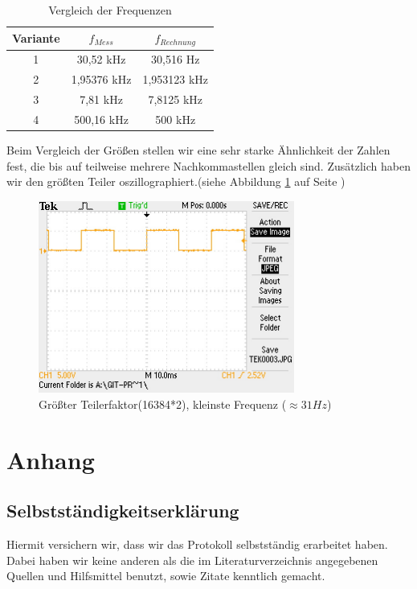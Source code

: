 \begin{table}[!ht]
\begin{center}
\begin{tabular}{||c|c|c||}
\hline 
\rule[-1ex]{0pt}{2.5ex} Variante & $f_{Mess}$ & $f_{Rechnung}$ \\ 
\hline 
\rule[-1ex]{0pt}{2.5ex} 1& 30,52 kHz & 30,516 Hz \\ 
\hline 
\rule[-1ex]{0pt}{2.5ex} 2&1,95376 kHz & 1,953123 kHz \\ 
\hline 
\rule[-1ex]{0pt}{2.5ex} 3&7,81 kHz & 7,8125 kHz \\ 
\hline 
\rule[-1ex]{0pt}{2.5ex} 4&500,16 kHz & 500 kHz \\ 
\hline 
\end{tabular} 
\caption{Vergleich der Frequenzen}
\end{center}
\end{table}
Beim Vergleich der Größen stellen wir eine sehr starke Ähnlichkeit der Zahlen fest, die bis auf teilweise mehrere Nachkommastellen gleich sind.
Zusätzlich haben wir den größten Teiler oszillographiert.(siehe Abbildung \ref{fq} auf Seite \pageref{fq})
\begin{figure}[!ht]
\begin{center}
\includegraphics[width=0.75\textwidth]{p3} 
\caption{Größter Teilerfaktor(16384*2), kleinste Frequenz ($\approx 31 Hz$)}
\label{fq}
\end{center}
\end{figure}

\clearpage

\section{Anhang}
\subsection{Selbstständigkeitserklärung}
Hiermit versichern wir, dass wir das Protokoll selbstständig erarbeitet haben. Dabei haben wir keine anderen als die im Literaturverzeichnis angegebenen Quellen und Hilfsmittel benutzt, sowie Zitate kenntlich gemacht. 
\listoffigures
\nocite{*}


